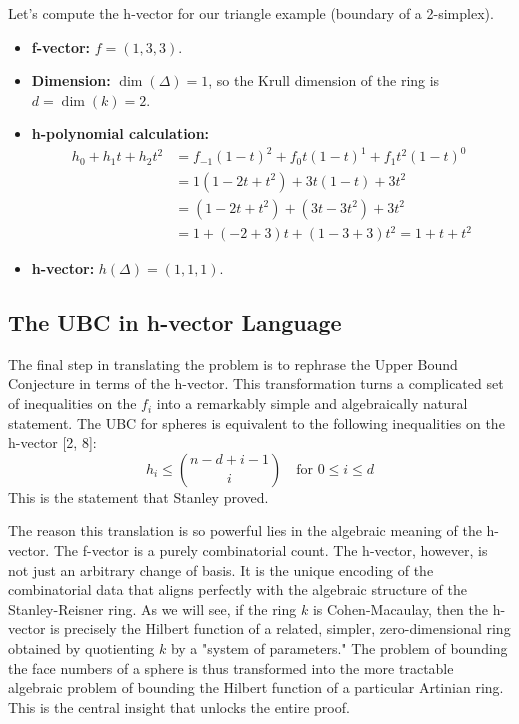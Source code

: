 \documentclass[11pt]{article}
\begin{document}
Let's compute the h-vector for our triangle example (boundary of a 2-simplex).
\begin{itemize}
    \item \textbf{f-vector:} $f = (1, 3, 3)$.
    \item \textbf{Dimension:} $\dim(\Delta) = 1$, so the Krull dimension of the ring is $d = \dim(k) = 2$.
    \item \textbf{h-polynomial calculation:}
    \begin{align*}
        h_0 + h_1 t + h_2 t^2 &= f_{-1}(1-t)^2 + f_0 t(1-t)^1 + f_1 t^2(1-t)^0 \\
        &= 1(1 - 2t + t^2) + 3t(1-t) + 3t^2 \\
        &= (1 - 2t + t^2) + (3t - 3t^2) + 3t^2 \\
        &= 1 + (-2+3)t + (1-3+3)t^2 = 1 + t + t^2
    \end{align*}
    \item \textbf{h-vector:} $h(\Delta) = (1, 1, 1)$.
\end{itemize}

\subsection{The UBC in h-vector Language}

The final step in translating the problem is to rephrase the Upper Bound Conjecture in terms of the h-vector. This transformation turns a complicated set of inequalities on the $f_i$ into a remarkably simple and algebraically natural statement. The UBC for spheres is equivalent to the following inequalities on the h-vector [2, 8]:
\[
h_i \le \binom{n-d+i-1}{i} \quad \text{for } 0 \le i \le d
\]
This is the statement that Stanley proved.

The reason this translation is so powerful lies in the algebraic meaning of the h-vector. The f-vector is a purely combinatorial count. The h-vector, however, is not just an arbitrary change of basis. It is the unique encoding of the combinatorial data that aligns perfectly with the algebraic structure of the Stanley-Reisner ring. As we will see, if the ring $k$ is Cohen-Macaulay, then the h-vector is precisely the Hilbert function of a related, simpler, zero-dimensional ring obtained by quotienting $k$ by a "system of parameters." The problem of bounding the face numbers of a sphere is thus transformed into the more tractable algebraic problem of bounding the Hilbert function of a particular Artinian ring. This is the central insight that unlocks the entire proof.
\end{document}
